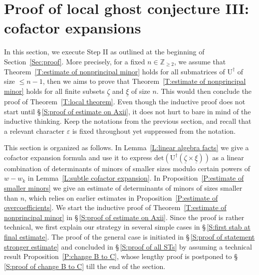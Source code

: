 \documentclass[12pt]{amsart}
\theoremstyle{definition}
\numberwithin{equation}{subsection}
\def\ZZ{\mathbb{Z}}
\def\rmU{\mathrm{U}}
\renewcommand{\det}{\mathrm{det}}
\begin{document}
\section{Proof of local ghost conjecture III: cofactor expansions}
\label{Sec:proof III}

In this section, we execute Step II as outlined at the beginning of Section~\ref{Sec:proof}. More precisely, for a fixed $n\in \ZZ_{\geq 2}$, we assume that Theorem~\ref{T:estimate of nonprincipal minor} holds for all submatrices of $\rmU^\dagger$ of size $\leq n-1$, then we aims to prove that Theorem~\ref{T:estimate of nonprincipal minor} holds for all finite subsets $\underline \zeta$ and $\underline \xi$ of size $n$. 
This would then conclude the proof of Theorem~\ref{T:local theorem}.
Even though the inductive proof does not start until \S\,\ref{S:proof of estimate on Axii}, it does not hurt to bare in mind of the inductive thinking. Keep the notations from the previous section, and recall that a relevant character $\varepsilon$ is fixed throughout yet suppressed from the notation.

This section is organized as follows. In Lemma~\ref{L:linear algebra facts} we give a cofactor expansion formula and use it to express $\det(\rmU^\dagger(\underline \zeta\times \underline \xi ))$ as a linear combination of determinants of minors of smaller sizes modulo certain powers of $w-w_k$ in Lemma~\ref{L:subtle cofactor expansion}. In Proposition~\ref{P:estimate of smaller minors} we give an estimate of determinants of minors of sizes smaller than $n$, which relies on earlier estimates in Proposition~\ref{P:estimate of overcoefficients}. We start the inductive proof of Theorem~\ref{T:estimate of nonprincipal minor} in \S\,\ref{S:proof of estimate on Axii}. Since the proof is rather technical, we first explain our strategy in several simple cases in \S\,\ref{S:first stab at final estimate}. The proof of the general case is initiated in \S\,\ref{S:proof of statement stronger estimate} and concluded in \S\,\ref{S:proof of all STs} by assuming a technical result Proposition~\ref{P:change B to C}, whose lengthy proof is postponed to \S\,\ref{S:proof of change B to C} till the end of the section.
\end{document}
